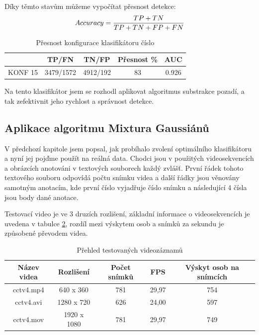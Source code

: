 Díky těmto stavům můžeme vypočítat přesnost detekce:
\begin{equation*}
\centering
 \label{eq:accuracy}
 \begin{aligned}
Accuracy = \frac{TP + TN}{TP + TN + FP + FN}
 \end{aligned}
\end{equation*}

\begin{table}[H]
\centering
\caption{Přesnost konfigurace klasifikátoru číslo}
\begin{tabular} { |c|c|c|c|c| }
\hline
{}          & {TP/FN} 	 & {TN/FP} 	& {Přesnost \%} & {AUC}  \\ \hline
KONF 15 	&  3479/1572 & 4912/192 &     83 		& 0.926  \\ \hline
\end{tabular}
\label{classTab2}
\end{table}
Na tento klasifikátor jsem se rozhodl aplikovat algoritmus substrakce pozadí, a tak zefektivnit jeho rychlost a správnost detekce.

\subsection{Aplikace algoritmu Mixtura Gaussiánů}
V předchozí kapitole jsem popsal, jak probíhalo zvolení optimálního klasifikátoru a nyní jej pojďme použít na reálná data. Chodci jsou v použitých videosekvencích a obrázcích anotováni v textových souborech každý zvlášť. První řádek tohoto textového souboru odpovídá počtu snímku videa a další řádky jsou věnovány samotným anotacím, kde první číslo vyjadřuje číslo snímku a následující 4 čísla jsou body dané anotace.

Testovací video je ve 3 druzích rozlišení, základní informace o videosekvencích je uvedena v tabulce \ref{videosTab}, rozdíl mezi výskytem osob a snímků za sekundu je způsobené převodem videa.

\begin{table}[H]
\centering
\caption{Přehled testovaných videozáznamů}
\begin{tabular} { |c|c|c|c|c| }
\hline
{Název videa}   & {Rozlišení} 	& {Počet snímků}    & {FPS} & {Výskyt osob na snímcích}  	\\ \hline
cctv4.mp4 		&  640 x  360	& 781  				& 29,97	& 	754				\\ \hline
cctv4.avi		& 1280 x  720	& 626  				& 24,00	& 	597				\\ \hline
cctv4.mov 		& 1920 x 1080	& 781  				& 29,97	& 	749				\\ \hline
\end{tabular}
\label{videosTab}
\end{table}

